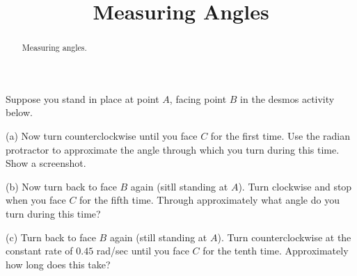\documentclass{ximera}
\title{Measuring Angles}
\begin{document}
\begin{abstract}
Measuring angles.
\end{abstract}
\maketitle



\begin{exploration}\label{exp:angles1}
Suppose you stand in place at point $A$, facing point $B$ in the desmos activity below. 

(a) Now turn counterclockwise until you face $C$ for the first time. Use the radian protractor to approximate the angle through which you turn during this time. Show a screenshot.

(b) Now turn back to face $B$ again (sitll standing at $A$). Turn clockwise and stop when you face $C$ for the fifth time. Through approximately what angle do you turn during this time? 

(c) Turn back to face $B$ again (still standing at $A$). Turn counterclockwise at the constant rate of $0.45$ rad/sec until you face $C$ for the tenth time. Approximately how long does this take? 


 
\begin{onlineOnly}
    \begin{center}
\end{center}
\end{onlineOnly}
\end{exploration}
\end{document}
